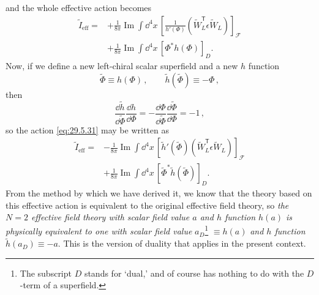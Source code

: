 and the whole effective action becomes
\begin{equation}
  \begin{aligned}
  \widetilde I_{\mathrm{eff}}
  ={}&+\frac{1}{8\pi}\operatorname{Im}\int \dd^4x\,
    \left[
      \frac{1}{h'(\Phi)}
      \left(\widetilde W_L^{\mathsf T}\epsilon\widetilde W_L\right)
    \right]_{\mathcal F}
  \\
  &+\frac{1}{8\pi}\operatorname{Im}\int \dd^4x\,
    \left[\Phi^*h(\Phi)\right]_D.
  \end{aligned}
  \tag{29.5.31}\label{eq:29.5.31}
\end{equation}
Now, if we define a new left-chiral scalar superfield and a new \(h\)
function
\begin{equation}
  \widetilde\Phi\equiv h(\Phi)\,,
  \qquad
  \widetilde h(\widetilde\Phi)\equiv-\Phi\,,
  \tag{29.5.32}\label{eq:29.5.32}
\end{equation}
then
\begin{equation}
  \frac{\dd\widetilde h}{\dd\widetilde\Phi}\frac{\dd h}{\dd\Phi}
  =-\frac{\dd\Phi}{\dd\widetilde\Phi}
    \frac{\dd\widetilde\Phi}{\dd\Phi}
  =-1\,,
  \tag{29.5.33}\label{eq:29.5.33}
\end{equation}
so the action \eqref{eq:29.5.31} may be written as
\begin{equation}
  \begin{aligned}
  \widetilde I_{\mathrm{eff}}
  ={}&-\frac{1}{8\pi}\operatorname{Im}\int \dd^4x\,
    \left[
      \widetilde h'(\widetilde\Phi)
      \left(\widetilde W_L^{\mathsf T}\epsilon\widetilde W_L\right)
    \right]_{\mathcal F}
  \\
  &+\frac{1}{8\pi}\operatorname{Im}\int \dd^4x\,
    \left[\widetilde\Phi^*\widetilde h(\widetilde\Phi)\right]_D.
  \end{aligned}
  \tag{29.5.34}\label{eq:29.5.34}
\end{equation}
From the method by which we have derived it, we know that the theory based on
this effective action is equivalent to the original effective field theory,
so \textit{the \(N=2\) effective field theory with scalar field value \(a\)
and \(h\) function \(h(a)\) is physically equivalent to one with scalar
field value} \(a_D\)\footnote{The subscript \(D\) stands for `dual,' and of
course has nothing to do with the \(D\)-term of a superfield.}
\(\equiv h(a)\) \textit{and \(h\) function}
\(\widetilde h(a_D)\equiv-a\). This is the version of duality that applies
in the present context.

